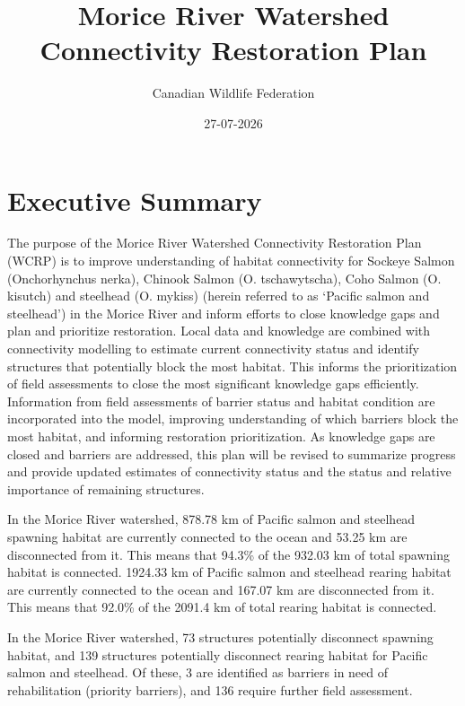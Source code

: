 \documentclass[
  letterpaper,
  DIV=11,
  numbers=noendperiod]{scrreprt}
\title{Morice River Watershed Connectivity Restoration Plan}
\author{Canadian Wildlife Federation}
\date{27-07-2026}
\renewcommand*\contentsname{Table of contents}
\newcommand\contentsname{Table of contents}
\begin{document}
\maketitle

\renewcommand*\contentsname{Table of contents}
{
\hypersetup{linkcolor=}
\setcounter{tocdepth}{1}
\tableofcontents
}


\chapter*{Executive Summary}\label{executive-summary}


The purpose of the Morice River Watershed Connectivity Restoration Plan
(WCRP) is to improve understanding of habitat connectivity for Sockeye
Salmon (Onchorhynchus nerka), Chinook Salmon (O. tschawytscha), Coho
Salmon (O. kisutch) and steelhead (O. mykiss) (herein referred to as
`Pacific salmon and steelhead') in the Morice River and inform efforts
to close knowledge gaps and plan and prioritize restoration. Local data
and knowledge are combined with connectivity modelling to estimate
current connectivity status and identify structures that potentially
block the most habitat. This informs the prioritization of field
assessments to close the most significant knowledge gaps efficiently.
Information from field assessments of barrier status and habitat
condition are incorporated into the model, improving understanding of
which barriers block the most habitat, and informing restoration
prioritization. As knowledge gaps are closed and barriers are addressed,
this plan will be revised to summarize progress and provide updated
estimates of connectivity status and the status and relative importance
of remaining structures.

In the Morice River watershed, 878.78 km of Pacific salmon and steelhead
spawning habitat are currently connected to the ocean and 53.25 km are
disconnected from it. This means that 94.3\% of the 932.03 km of total
spawning habitat is connected. 1924.33 km of Pacific salmon and
steelhead rearing habitat are currently connected to the ocean and
167.07 km are disconnected from it. This means that 92.0\% of the 2091.4
km of total rearing habitat is connected.

In the Morice River watershed, 73 structures potentially disconnect
spawning habitat, and 139 structures potentially disconnect rearing
habitat for Pacific salmon and steelhead. Of these, 3 are identified as
barriers in need of rehabilitation (priority barriers), and 136 require
further field assessment.
\end{document}
